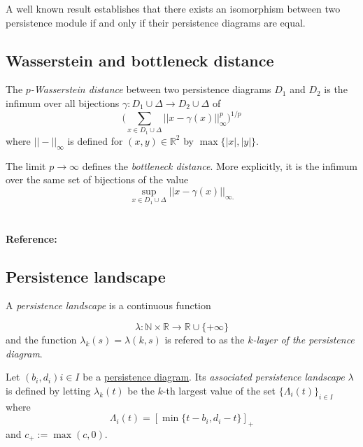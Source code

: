 \documentclass{amsart}
\begin{document}
	A well known result establishes that there exists an isomorphism between two persistence module if and only if their persistence diagrams are equal.
	
	\subsection*{Wasserstein and bottleneck distance}	\label{wasserstein and bottleneck distance}
	
	The \textit{$p$-Wasserstein distance} between two persistence diagrams $D_1$ and $D_2$ is the infimum over all bijections $\gamma: D_1 \cup \Delta \to D_2 \cup \Delta$ of
	\begin{equation*}
	\Big(\sum_{x \in D_1 \cup \Delta} ||x - \gamma(x)||_\infty^p \Big)^{1/p}
	\end{equation*}
	where $||-||_\infty$ is defined for $(x,y) \in \mathbb R^2$ by $\max\{|x|, |y|\}$. 
	
	The limit $p \to \infty$ defines the \textit{bottleneck distance}. More explicitly, it is the infimum over the same set of bijections of the value
	\begin{equation*}
	\sup_{x \in D_1 \cup \Delta} ||x - \gamma(x)||_{\infty.}
	\end{equation*}
	
	\paragraph{\\ Reference:} \cite{kerber2017geometry}
	
	\subsection*{Persistence landscape} \label{persistence landscape}
	
	A \textit{persistence landscape} is a continuous function
	
	\begin{equation*}
	\lambda : \mathbb N \times \mathbb R \to \mathbb R \cup \{+\infty\}
	\end{equation*}
	and the function $\lambda_k(s) = \lambda(k,s)$ is refered to as the \textit{$k$-layer of the persistence diagram}.
	
	Let ${(b_i, d_i)}{i \in I}$ be a \hyperref[persistence diagram] {persistence diagram}. Its \textit{associated persistence landscape} $\lambda$ is defined by letting $\lambda_k(t)$ be the $k$-th largest value of the set $\{\Lambda_i(t)\}_ {i \in I}$ where
	\begin{equation*}
	\Lambda_i(t) = \left[ \min \{t-b_i, d_i-t\}\right]_+
	\end{equation*}
	and $c_+ := \max(c,0)$.
	
\end{document}
